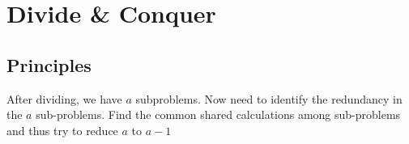 \chapter{Divide \& Conquer}

\section{Principles}
 After dividing, we have $a$ subproblems. Now need to identify the redundancy in the $a$ sub-problems. Find the common shared calculations among sub-problems and thus try to reduce $a$ to $a-1$
